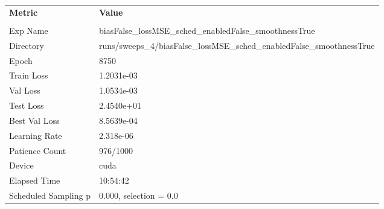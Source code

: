 \begin{tabular}{|l|l|}
\hline
\textbf{Metric} & \textbf{Value} \\\\
Exp Name & biasFalse_lossMSE_sched_enabledFalse_smoothnessTrue \\ 
Directory & runs/sweeps_4/biasFalse_lossMSE_sched_enabledFalse_smoothnessTrue \\ 
Epoch & 8750 \\ 
Train Loss & 1.2031e-03 \\ 
Val Loss & 1.0534e-03 \\ 
Test Loss & 2.4540e+01 \\ 
Best Val Loss & 8.5639e-04 \\ 
Learning Rate & 2.318e-06 \\ 
Patience Count & 976/1000 \\ 
Device & cuda \\ 
Elapsed Time & 10:54:42 \\ 
Scheduled Sampling p & 0.000, selection = 0.0 \\ 
\hline
\end{tabular}